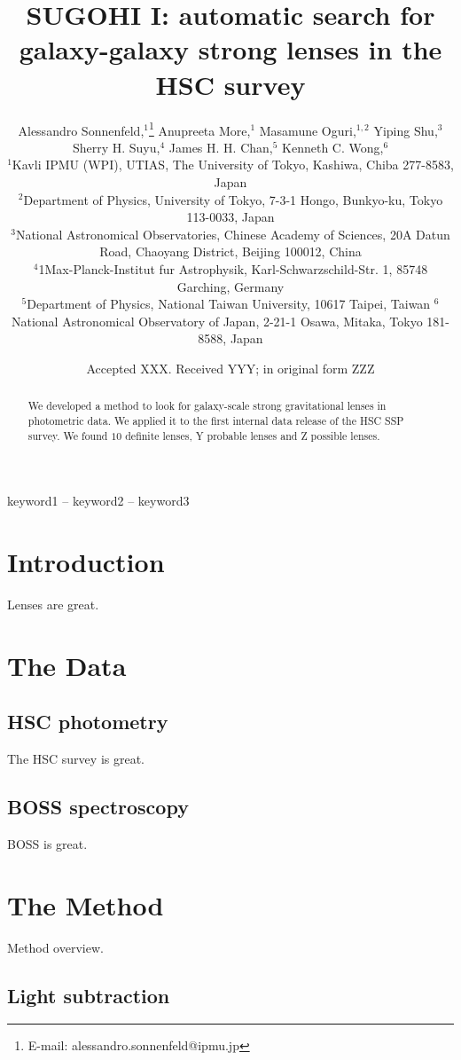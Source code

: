 \documentclass[a4paper,fleqn,usenatbib]{mnras}
\title[]{SUGOHI I: automatic search for galaxy-galaxy strong lenses in the HSC survey}
\author[A. Sonnenfeld et al.]{
Alessandro Sonnenfeld,$^{1}$\thanks{E-mail: alessandro.sonnenfeld@ipmu.jp}
Anupreeta More,$^{1}$
Masamune Oguri,$^{1,2}$
Yiping Shu,$^{3}$\newauthor
Sherry H. Suyu,$^{4}$
James H. H. Chan,$^{5}$
Kenneth C. Wong,$^{6}$
\\
$^{1}$Kavli IPMU (WPI), UTIAS, The University of Tokyo, Kashiwa, Chiba 277-8583, Japan \\
$^{2}$Department of Physics, University of Tokyo, 7-3-1 Hongo, Bunkyo-ku, Tokyo 113-0033, Japan \\
$^{3}$National Astronomical Observatories, Chinese Academy of
Sciences, 20A Datun Road, Chaoyang District, Beijing 100012,
China \\
$^{4}$1Max-Planck-Institut fur Astrophysik, Karl-Schwarzschild-Str. 1, 85748 Garching, Germany \\
$^{5}$Department of Physics, National Taiwan University, 10617 Taipei, Taiwan
$^{6}$National Astronomical Observatory of Japan, 2-21-1 Osawa, Mitaka, Tokyo 181-8588, Japan
}
\date{Accepted XXX. Received YYY; in original form ZZZ}
\def\ngradeA{10}
\begin{document}
\label{firstpage}
\pagerange{\pageref{firstpage}--\pageref{lastpage}}
\maketitle

\begin{abstract}
We developed a method to look for galaxy-scale strong gravitational lenses in photometric data. We applied it to the first internal data release of the HSC SSP survey. We found $\ngradeA$ definite lenses, Y probable lenses and Z possible lenses.
\end{abstract}

\begin{keywords}
keyword1 -- keyword2 -- keyword3
\end{keywords}



\section{Introduction}

Lenses are great.

\section{The Data}

\subsection{HSC photometry}
The HSC survey is great.

\subsection{BOSS spectroscopy}
BOSS is great.

\section{The Method}

Method overview.

\subsection{Light subtraction}
\end{document}
